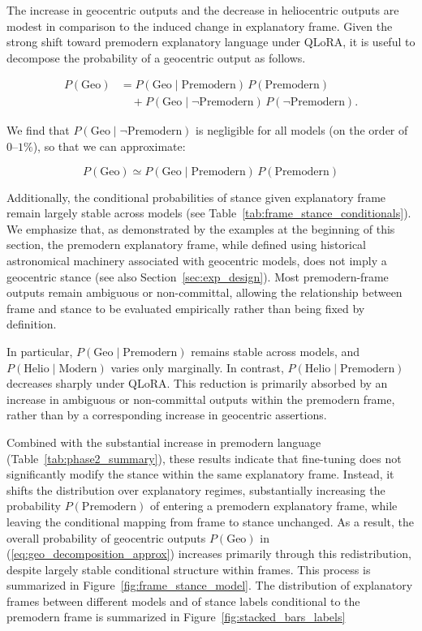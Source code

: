 The increase in geocentric outputs and the decrease in heliocentric outputs are modest in comparison to the induced change in explanatory frame. Given the strong shift toward premodern explanatory language under QLoRA, it is useful to decompose the probability of a geocentric output as follows.

\begin{equation*}
\begin{aligned}
P(\mathrm{Geo})
&= P(\mathrm{Geo}\mid \mathrm{Premodern})\,P(\mathrm{Premodern}) \\
&\quad + P(\mathrm{Geo}\mid \neg \mathrm{Premodern})\,P(\neg \mathrm{Premodern}) .
\end{aligned}
\end{equation*}

We find that $P(\mathrm{Geo}\mid \neg \mathrm{Premodern})$ is negligible for all models (on the order of $0$–$1\%$), so that we can approximate:

\begin{equation}\label{eq:geo_decomposition_approx}
P(\mathrm{Geo}) \simeq P(\mathrm{Geo}\mid \mathrm{Premodern})\,P(\mathrm{Premodern})
\end{equation}


Additionally, the conditional probabilities of stance given explanatory frame remain largely stable across models (see Table~\ref{tab:frame_stance_conditionals}). We emphasize that, as demonstrated by the examples at the beginning of this section, the premodern explanatory frame, while defined using historical astronomical machinery associated with geocentric models, does not imply a geocentric stance (see also Section~\ref{sec:exp_design}). Most premodern-frame outputs remain ambiguous or non-committal, allowing the relationship between frame and stance to be evaluated empirically rather than being fixed by definition.

In particular, $P(\mathrm{Geo}\mid\mathrm{Premodern})$ remains stable across models, and $P(\mathrm{Helio}\mid\mathrm{Modern})$ varies only marginally. In contrast, $P(\mathrm{Helio}\mid\mathrm{Premodern})$ decreases sharply under QLoRA. This reduction is primarily absorbed by an increase in ambiguous or non-committal outputs within the premodern frame, rather than by a corresponding increase in geocentric assertions.

Combined with the substantial increase in premodern language (Table~\ref{tab:phase2_summary}), these results indicate that fine-tuning does not significantly modify the stance within the same explanatory frame. Instead, it shifts the distribution over explanatory regimes, substantially increasing the probability $P(\mathrm{Premodern})$ of entering a premodern explanatory frame, while leaving the conditional mapping from frame to stance unchanged. As a result, the overall probability of geocentric outputs $P(\mathrm{Geo})$ in (\ref{eq:geo_decomposition_approx}) increases primarily through this redistribution, despite largely stable conditional structure within frames. This process is summarized in Figure~\ref{fig:frame_stance_model}. The distribution of explanatory frames between different models and of stance labels conditional to the premodern frame is summarized in Figure~\ref{fig:stacked_bars_labels}


